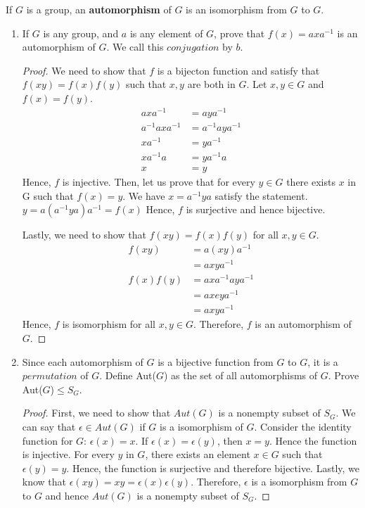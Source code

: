 \documentclass[12pt]{article}
\begin{document}
	If $G$ is a group, an \textbf{automorphism} of $G$ is an isomorphism from $G$ to $G$.
	\begin{enumerate}
		\item If $G$ is any group, and $a$ is any element of $G$, prove that $f(x) = axa^{-1}$ is an automorphism of $G$. We call this $conjugation$ by $b$.
		
	\begin{proof}
		We need to show that $f$ is a bijecton function and satisfy that $f(xy) = f(x)f(y)$ such that $x,y$ are both in $G$.
		Let $x,y \in G$ and $f(x) = f(y)$.
		\begin{align*}
			axa^{-1} &= aya^{-1} \\
			a^{-1}	axa^{-1} &= 	a^{-1}aya^{-1} \\
			xa^{-1} &= ya^{-1} \\
				xa^{-1}a &= ya^{-1}a \\
				x&=y
		\end{align*}
	Hence, $f$ is injective.
	Then, let us prove that for every $y \in G$ there exists $ x$ in G such that $f(x) = y$.
	 We have $x = a^{-1}ya$ satisfy the statement. $y = a( a^{-1}ya)a^{-1}= f(x)$ Hence, $f$ is surjective and hence bijective.
	 
	 Lastly, we need to show that $f(xy) = f(x)f(y)$ for all $x,y \in G$.
	 \begin{align*}
	 	f(xy) &= a(xy)a^{-1} \\
	 &= axya^{-1}\\
	 f(x)f(y) &= axa^{-1}  aya^{-1}\\
	  &= axeya^{-1}\\
	  	  &= axya^{-1}
	 \end{align*}
	 Hence, $f$ is isomorphism for all $x,y \in G$. Therefore, $f$ is an automorphism of $G$.
	 	\end{proof}
		\item Since each automorphism of $G$ is a bijective function from $G$ to $G$, it is a $permutation$ of $G$. Define Aut($G$) as the set of all automorphisms of $G$. Prove Aut($G$)$\leq S_G$.
		
		\begin{proof}
			First, we need to show that $Aut(G)$ is a nonempty subset of $S_G$. We can say that $\epsilon \in Aut(G)$ if $G$ is a isomorphism of $G$. Consider the identity function for $G$: $\epsilon(x) = x$. If $\epsilon(x) = \epsilon(y)$, then $x=y$. Hence the function is injective. For every $y$ in $G$, there exists an element $x \in G$ such that $\epsilon(y) = y$. Hence, the function is surjective and therefore bijective. Lastly, we know that  $\epsilon(xy) = xy = \epsilon(x)\epsilon(y)$. Therefore, $\epsilon$ is a isomorphism from $G$ to $G$ and hence $Aut(G)$ is a nonempty subset of $S_G$.
			

\end{proof}
\end{enumerate}
\end{document}
